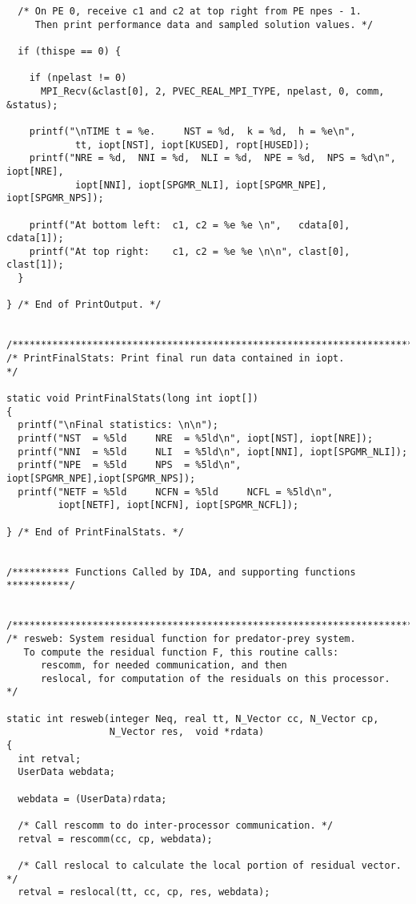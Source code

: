 \begin{verbatim}
  /* On PE 0, receive c1 and c2 at top right from PE npes - 1.
     Then print performance data and sampled solution values. */

  if (thispe == 0) {

    if (npelast != 0)
      MPI_Recv(&clast[0], 2, PVEC_REAL_MPI_TYPE, npelast, 0, comm, &status);

    printf("\nTIME t = %e.     NST = %d,  k = %d,  h = %e\n",
            tt, iopt[NST], iopt[KUSED], ropt[HUSED]);
    printf("NRE = %d,  NNI = %d,  NLI = %d,  NPE = %d,  NPS = %d\n",  iopt[NRE],
            iopt[NNI], iopt[SPGMR_NLI], iopt[SPGMR_NPE], iopt[SPGMR_NPS]);

    printf("At bottom left:  c1, c2 = %e %e \n",   cdata[0], cdata[1]);
    printf("At top right:    c1, c2 = %e %e \n\n", clast[0], clast[1]);
  }

} /* End of PrintOutput. */


/*************************************************************************/
/* PrintFinalStats: Print final run data contained in iopt.              */

static void PrintFinalStats(long int iopt[])
{
  printf("\nFinal statistics: \n\n");
  printf("NST  = %5ld     NRE  = %5ld\n", iopt[NST], iopt[NRE]);
  printf("NNI  = %5ld     NLI  = %5ld\n", iopt[NNI], iopt[SPGMR_NLI]);
  printf("NPE  = %5ld     NPS  = %5ld\n", iopt[SPGMR_NPE],iopt[SPGMR_NPS]);
  printf("NETF = %5ld     NCFN = %5ld     NCFL = %5ld\n",
         iopt[NETF], iopt[NCFN], iopt[SPGMR_NCFL]);

} /* End of PrintFinalStats. */


/********** Functions Called by IDA, and supporting functions  ***********/


/*************************************************************************/
/* resweb: System residual function for predator-prey system.
   To compute the residual function F, this routine calls:
      rescomm, for needed communication, and then
      reslocal, for computation of the residuals on this processor.      */

static int resweb(integer Neq, real tt, N_Vector cc, N_Vector cp, 
                  N_Vector res,  void *rdata)
{
  int retval;
  UserData webdata;

  webdata = (UserData)rdata;

  /* Call rescomm to do inter-processor communication. */
  retval = rescomm(cc, cp, webdata);

  /* Call reslocal to calculate the local portion of residual vector. */
  retval = reslocal(tt, cc, cp, res, webdata);


\end{verbatim}
